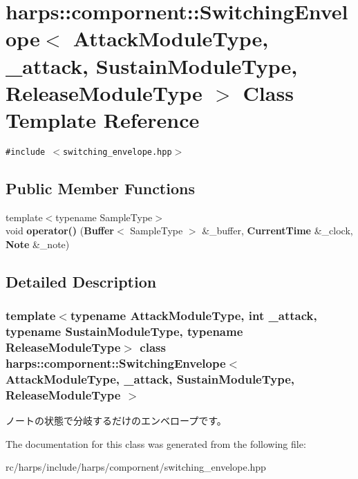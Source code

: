 \section{harps::compornent::SwitchingEnvelope$<$ AttackModuleType, \_\-attack, SustainModuleType, ReleaseModuleType $>$ Class Template Reference}
\label{classharps_1_1compornent_1_1SwitchingEnvelope}
{\tt \#include $<$switching\_\-envelope.hpp$>$}

\subsection*{Public Member Functions}
\begin{CompactItemize}
\item 
{\footnotesize template$<$typename SampleType$>$ }\\void \textbf{operator()} ({\bf Buffer}$<$ SampleType $>$ \&\_\-buffer, {\bf CurrentTime} \&\_\-clock, {\bf Note} \&\_\-note)\label{classharps_1_1compornent_1_1SwitchingEnvelope_a034bebbc5d41d710d14242499a84203}

\end{CompactItemize}


\subsection{Detailed Description}
\subsubsection*{template$<$typename AttackModuleType, int \_\-attack, typename SustainModuleType, typename ReleaseModuleType$>$ class harps::compornent::SwitchingEnvelope$<$ AttackModuleType, \_\-attack, SustainModuleType, ReleaseModuleType $>$}

ノートの状態で分岐するだけのエンベロープです。 

The documentation for this class was generated from the following file:\begin{CompactItemize}
\item 
rc/harps/include/harps/compornent/switching\_\-envelope.hpp\end{CompactItemize}
